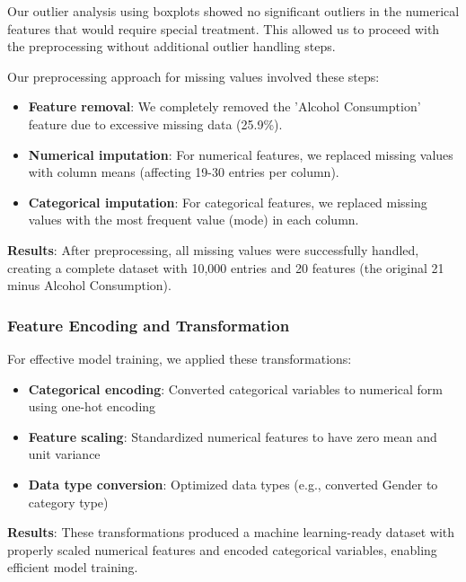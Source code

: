 \documentclass[11pt,a4paper]{article}
\begin{document}
Our outlier analysis using boxplots showed no significant outliers in the numerical features that would require special treatment. This allowed us to proceed with the preprocessing without additional outlier handling steps.

Our preprocessing approach for missing values involved these steps:

\vspace{-0.25cm}
\begin{itemize}
    \vspace{-0.25cm}
    \item \textbf{Feature removal}: We completely removed the 'Alcohol Consumption' feature due to excessive missing data (25.9\%).
          \vspace{-0.25cm}
    \item \textbf{Numerical imputation}: For numerical features, we replaced missing values with column means (affecting 19-30 entries per column).
          \vspace{-0.25cm}
    \item \textbf{Categorical imputation}: For categorical features, we replaced missing values with the most frequent value (mode) in each column.
\end{itemize}

\textbf{Results}: After preprocessing, all missing values were successfully handled, creating a complete dataset with 10,000 entries and 20 features (the original 21 minus Alcohol Consumption).

\subsubsection{Feature Encoding and Transformation}
\vspace{-0.25cm}

For effective model training, we applied these transformations:

\vspace{-0.25cm}
\begin{itemize}
    \vspace{-0.25cm}
    \item \textbf{Categorical encoding}: Converted categorical variables to numerical form using one-hot encoding
          \vspace{-0.25cm}
    \item \textbf{Feature scaling}: Standardized numerical features to have zero mean and unit variance
          \vspace{-0.25cm}
    \item \textbf{Data type conversion}: Optimized data types (e.g., converted Gender to category type)
\end{itemize}
\vspace{-0.25cm}
\textbf{Results}: These transformations produced a machine learning-ready dataset with properly scaled numerical features and encoded categorical variables, enabling efficient model training.
\end{document}
